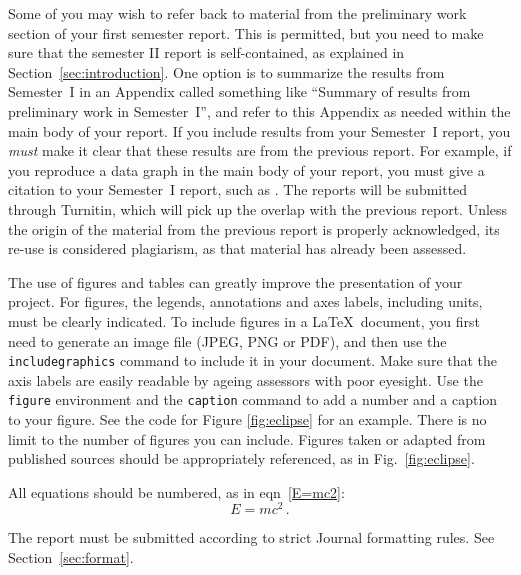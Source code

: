 \documentclass[a4paper,fleqn,usenatbib]{mnras}
\begin{document}
Some of you may wish to refer back to material from the preliminary work section of your first semester report. This is permitted, but you need to make sure that the semester II report is self-contained, as explained in Section~\ref{sec:introduction}. One option is to summarize the results from Semester~I in an Appendix called something like ``Summary of results from preliminary work in Semester~I'', and refer to this Appendix as needed within the main body of your report. If you include results from your Semester~I report, you \textit{must} make it clear that these results are from the previous report. For example, if you reproduce a data graph in the main body of your report, you must give a citation to your Semester~I report, such as \citep{semester 1 report}. The reports will be submitted through Turnitin, which will pick up the overlap with the previous report. Unless the origin of the material from the previous report is properly acknowledged, its re-use is considered plagiarism, as that material has already been assessed.

 The use of figures and tables can greatly improve the presentation of your project. For figures, the legends, annotations and axes labels, including units, must be clearly indicated. To include figures in a \LaTeX\ document, you first need to generate an image file (JPEG, PNG or PDF), and then use the {\tt includegraphics} command to include it in your document. Make sure that the axis labels are easily readable by ageing assessors with poor eyesight. Use the {\tt figure} environment and the {\tt caption} command to add a number and a caption to your figure. See the code for Figure \ref{fig:eclipse} for an example. There is no limit to the number of figures you can include. 
Figures taken or adapted from published sources should be appropriately referenced, as in Fig.~\ref{fig:eclipse}.

All equations should be numbered, as in eqn~\ref{E=mc2}:
\begin{equation}
\label{E=mc2}
E = mc^2 \, .
\end{equation}



The report must be submitted according to strict Journal formatting rules. See Section~\ref{sec:format}.
\end{document}
